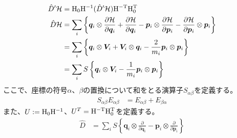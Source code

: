 \documentclass[11pt,a4paper,uplatex]{jsarticle}
\begin{document}
\begin{align}
    \hat{D}'{\cal H} &= {\rm H_{0} H^{-1}} (\hat{D}' {\cal H}) {\rm H^{-T} H_{0}^{T}} \\
    \hat{D} {\cal H} &= \sum_{i} \left\{
      \bm{q}_{i} \otimes \frac{\partial {\cal H}}{\partial \bm{q}_{i}} + \frac{\partial {\cal H}}{\partial \bm{q}_{i}} 
      - \bm{p}_{i} \otimes \frac{\partial {\cal H}}{\partial \bm{p}_{i}} - \frac{\partial {\cal H}}{\partial \bm{p}_{i}} \otimes \bm{p}_{i}
    \right\} \\
    &= \sum_{i} \left\{ \bm{q}_{i} \otimes \bm{V}_{i} + \bm{V}_{i} \otimes \bm{q}_{i} - \frac{2}{m_{i}} \bm{p}_{i} \otimes \bm{p}_{i}  \right\} \\
    &= \sum_{i} S \left\{ \bm{q}_{i} \otimes \bm{V}_{i} - \frac{1}{m_{i}} \bm{p}_{i} \otimes \bm{p}_{i}\right\}
\end{align}
ここで、座標の符号$\alpha$、$\beta$の置換について和をとる演算子$S_{\alpha\beta}$を定義する。
\begin{align}
  S_{\alpha \beta} E_{\alpha \beta} &= E_{\alpha \beta} + E_{\beta \alpha} 
\end{align}
また、$U:={\rm H_{0} H^{-1}}$、$U^{T}= {\rm H^{-T} H_{0}^T}$を定義する。
\begin{align}
    \hat{D} &= \sum_{i} S \left\{ \bm{q}_{i} \otimes \frac{\partial }{\partial \bm{q}_{i}} - \bm{p}_{i} \otimes \frac{\partial }{\partial \bm{p}_{i} } \right\}
\end{align}
\end{document}
